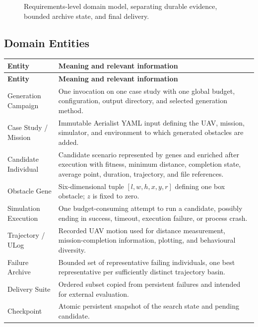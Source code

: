 \documentclass[11pt,a4paper,openany]{report}
\begin{document}
\begin{figure}[H]
\caption{Requirements-level domain model, separating durable evidence, bounded archive state, and final delivery.}
\label{fig:domain}
\end{figure}

\subsection{Domain Entities}
\begin{longtable}{L{3.2cm} L{11.5cm}}
\toprule
\textbf{Entity} & \textbf{Meaning and relevant information}\\
\midrule
\endfirsthead
\toprule
\textbf{Entity} & \textbf{Meaning and relevant information}\\
\midrule
\endhead
Generation Campaign & One invocation on one case study with one global budget, configuration, output directory, and selected generation method.\\
Case Study / Mission & Immutable Aerialist YAML input defining the UAV, mission, simulator, and environment to which generated obstacles are added.\\
Candidate Individual & Candidate scenario represented by genes and enriched after execution with fitness, minimum distance, completion state, average point, duration, trajectory, and file references.\\
Obstacle Gene & Six-dimensional tuple $[l,w,h,x,y,r]$ defining one box obstacle; $z$ is fixed to zero.\\
Simulation Execution & One budget-consuming attempt to run a candidate, possibly ending in success, timeout, execution failure, or process crash.\\
Trajectory / ULog & Recorded UAV motion used for distance measurement, mission-completion information, plotting, and behavioural diversity.\\
Failure Archive & Bounded set of representative failing individuals, one best representative per sufficiently distinct trajectory basin.\\
Delivery Suite & Ordered subset copied from persistent failures and intended for external evaluation.\\
Checkpoint & Atomic persistent snapshot of the search state and pending candidate.\\
\bottomrule
\end{longtable}
\end{document}
